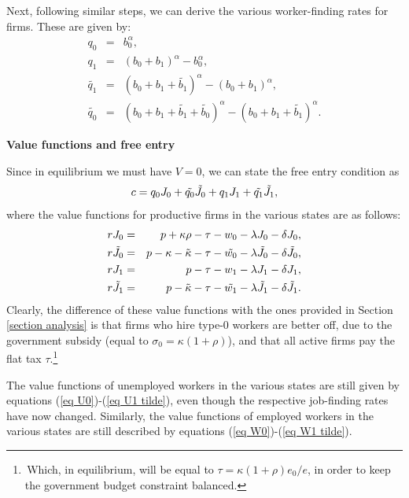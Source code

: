 \documentclass[12pt]{article} %
\theoremstyle{definition}
\begin{document}
\begin{appendix}
Next, following similar steps, we can derive the various worker-finding rates for firms. These are given by:  
\begin{eqnarray*}
	q_0 &=& b_0^\alpha, \nonumber  \\
	{q_1} &=&  (b_0+{b_1})^\alpha - b_0^\alpha, \nonumber \\
	\tilde{q_1} &=& (b_0+b_1+\tilde{b_1})^\alpha - (b_0+{b_1})^\alpha, \nonumber  \\
	\tilde{q_0} &=&  (b_0+b_1+\tilde{b_1}+\tilde{b_0})^\alpha - (b_0+b_1+\tilde{b_1})^\alpha. \nonumber 
\end{eqnarray*}

\medskip 

\noindent \textbf{Value functions and free entry}

\medskip 

\noindent Since in equilibrium we must have $V=0$, we can state the free entry condition as 
\begin{equation}
c= q_0 J_0 + \Tilde{q_0}\Tilde{J_0} + q_1 J_1 + \Tilde{q_1}\Tilde{J_1}, \label{eq free entry intervention 4} 
\end{equation}where the value functions for productive firms in the various states are as follows: \begin{eqnarray}rJ_0 &=&p+\kappa \rho- \tau  -w_0-\lambda J_0 - \delta J_0, \nonumber \\
	r\Tilde{J_0} &=&p-\kappa-\Tilde{\kappa}- \tau -\Tilde{w_0}-\lambda \Tilde{J_0} - \delta \Tilde{J_0},\nonumber \\
	rJ_1 &=&p- \tau -w_1-\lambda J_1 - \delta J_1, \nonumber \\
	r\Tilde{J_1} &=&p-\Tilde{\kappa}-\tau-\Tilde{w_1}-\lambda \Tilde{J_1} - \delta \Tilde{J_1}.\nonumber 
\end{eqnarray}Clearly, the difference of these value functions with the ones provided in Section \ref{section analysis} is that firms who hire type-0 workers are better off, due to the government subsidy (equal to $\sigma_0=\kappa (1+\rho)$), and that all active firms pay the flat tax $\tau$.\footnote{\,Which, in equilibrium, will be equal to $\tau = \kappa(1+\rho)e_0/e$, in order to keep the government budget constraint balanced.} 

The value functions of unemployed workers in the various states are still given by equations (\ref{eq U0})-(\ref{eq U1 tilde}), even though the respective job-finding rates have now changed. Similarly, the value functions of employed workers in the various states are still described by equations (\ref{eq W0})-(\ref{eq W1 tilde}).


\end{appendix}
\end{document}
